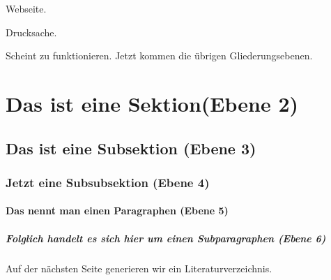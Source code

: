 \documentclass[12pt, oneside, openany]{scrreprt}
\begin{document}
Webseite.\cite[prefix = {}, suffix = {.}]{kochMerzWerDaten2025}

Drucksache.\cite[prefix = {}, suffix = {.}]{StellungnahmeEntwurfGesetzes}

Scheint zu funktionieren. Jetzt kommen die übrigen Gliederungsebenen.

\section{Das ist eine Sektion(Ebene 2) }

\subsection{Das ist eine Subsektion (Ebene 3)}

\subsubsection{Jetzt eine Subsubsektion (Ebene 4)}

\paragraph{Das nennt man einen Paragraphen (Ebene 5)}

\subparagraph{Folglich handelt es sich hier um einen Subparagraphen (Ebene 6)}

Auf der nächsten Seite generieren wir ein Literaturverzeichnis.

\printbibliography[title=Literaturverzeichnis, nottype = {legal_case}] 
\end{document}
